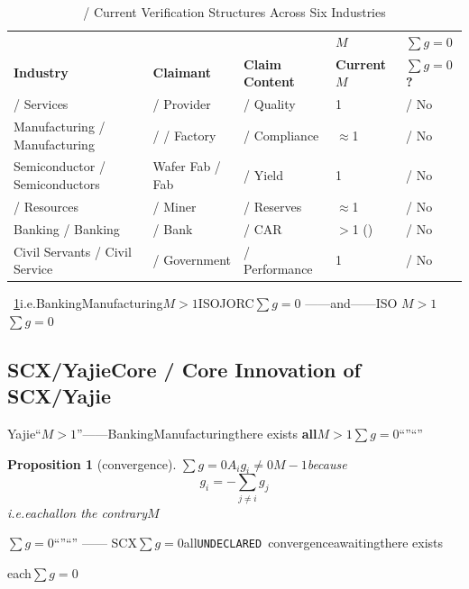 \documentclass[12pt,a4paper]{article}
\newtheorem{proposition}[theorem]{Proposition}
\theoremstyle{remark}
\newcommand{\sumgeq}{\sum g = 0}
\newcommand{\undeclared}{\texttt{UNDECLARED}}
\begin{document}
\begin{table}[H]
\centering
\caption{ / Current Verification Structures Across Six Industries}
\label{tab:industry_trust}
\begin{tabular}{@{}p{2.5cm}p{2.5cm}p{3.5cm}p{2cm}p{2.5cm}@{}}
\toprule
\textbf{} & \textbf{} & \textbf{} & \textbf{$M$} & \textbf{$\sumgeq$} \\
\textbf{Industry} & \textbf{Claimant} & \textbf{Claim Content} & \textbf{Current $M$} & \textbf{$\sumgeq$?} \\
\midrule
 / Services &  / Provider &  / Quality & 1 &  / No \\
Manufacturing / Manufacturing & / / Factory &  / Compliance & $\approx$1 &  / No \\
Semiconductor / Semiconductors & Wafer Fab / Fab &  / Yield & 1 &  / No \\
 / Resources &  / Miner &  / Reserves & $\approx$1 &  / No \\
Banking / Banking &  / Bank &  / CAR & $>$1 () &  / No \\
Civil Servants / Civil Service &  / Government &  / Performance & 1 &  / No \\
\bottomrule
\end{tabular}
\end{table}

~\ref{tab:industry_trust}i.e.BankingManufacturing$M>1$ISOJORC\textbf{$\sumgeq$}
——and——ISO
$M>1$$\sumgeq$

\subsection{SCX/YajieCore / Core Innovation of SCX/Yajie}

Yajie``$M>1$''——BankingManufacturingthere exists
\textbf{all$M>1$$\sumgeq$}``''``''

\begin{proposition}[convergence]
$\sumgeq$$A_i$$g_i \neq 0$$M-1$because
\begin{equation}
    g_i = -\sum_{j \neq i} g_j
\end{equation}
i.e.eachallon the contrary$M$
\end{proposition}

$\sumgeq$``''``''
——
SCX$\sumgeq$all\undeclared\
convergenceawaitingthere exists

each$\sumgeq$


\end{document}
